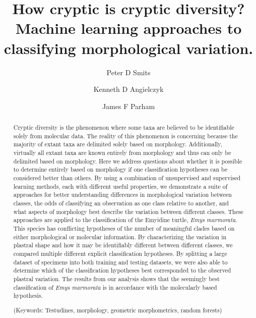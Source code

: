 \documentclass[12pt,letterpaper]{article}\usepackage{graphicx, color}
\title{How cryptic is cryptic diversity? Machine learning approaches to classifying morphological variation.}
\author[1]{Peter D Smits}%
\author[2]{Kenneth D Angielczyk}%
\author[3]{James F Parham}%
\affil[1]{Committee on Evolutionary Biology, University of Chicago}
\affil[2]{Department of Geology, Field Museum of Natural History}
\affil[3]{Department of Geological Sciences, California State University -- Fullerton}
\renewcommand{\section}[1]{%
\bigskip
\begin{center}
\begin{Large}
\normalfont\scshape #1
\medskip
\end{Large}
\end{center}}
\begin{document}
\maketitle
{}


\begin{abstract}
  Cryptic diversity is the phenomenon where some taxa are believed to be identifiable solely from molecular data. The reality of this phenomenon is concerning because the majority of extant taxa are delimited solely based on morphology. Additionally, virtually all extant taxa are known entirely from morphology and thus can only be delimited based on morphology. Here we address questions about whether it is possible to determine entirely based on morphology if one classification hypotheses can be considered better than others.
  By using a combination of unsupervised and supervised learning methods, each with different useful properties, we demonstrate a suite of approaches for better understanding differences in morphological variation between classes, the odds of classifying an observation as one class relative to another, and what aspects of morphology best describe the variation between different classes.
  These approaches are applied to the classification of the Emyidine turtle, \textit{Emys marmorata}. This species has conflicting hypotheses of the number of meaningful clades based on either morphological or molecular information. By characterizing the variation in plastral shape and how it may be identifiably different between different classes, we compared multiple different explicit classification hypotheses. By splitting a large dataset of specimens into both training and testing datasets, we were also able to determine which of the classification hypotheses best corresponded to the observed plastral variation.
  The results from our analysis shows that the seemingly best classification of \textit{Emys marmorata} is in accordance with the molecularly based hypothesis.
 
\noindent (Keywords: Testudines, morphology, geometric morphometrics, random forests)
\end{abstract}

\end{document}
